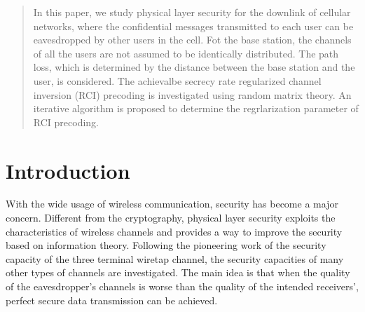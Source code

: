 \documentclass[12pt,journal,draftclsnofoot,onecolumn]{IEEEtran}
\begin{document}




\maketitle

\begin{abstract}
In this paper, we study physical layer security for the
downlink of cellular networks, where the confidential messages
transmitted to each user can be eavesdropped by other users in the cell. Fot the base station, the channels of all the users are not assumed to be identically distributed. The path loss, which is determined by the distance between the base station and the user, is considered. The achievalbe secrecy rate regularized channel inversion (RCI) precoding  is investigated using random matrix theory. An iterative algorithm is proposed to determine the regrlarization parameter of RCI precoding.
\end{abstract}





%
\IEEEpeerreviewmaketitle



\section{Introduction}
With the wide usage of wireless communication, security has become a major concern. Different from the cryptography, physical layer security exploits the characteristics of wireless channels and provides a way to improve the security based on information theory. Following the pioneering work of the security capacity of the three terminal wiretap channel, the security capacities of many other types of channels are investigated. The main idea is that when the quality of the eavesdropper's channels is worse than the quality of the intended receivers', perfect secure data transmission can be achieved.
\end{document}
